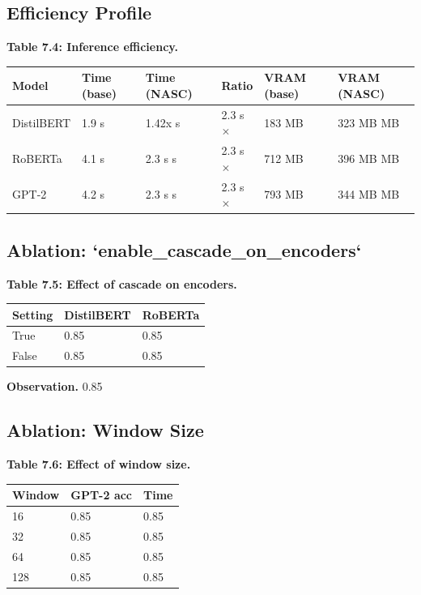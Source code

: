 \subsection{Efficiency Profile}

\textbf{Table 7.4: Inference efficiency.}

\begin{table}[H]
\centering
\small
\begin{tabular}{llllll}
\toprule
\textbf{Model} & \textbf{Time (base)} & \textbf{Time (NASC)} & \textbf{Ratio} & \textbf{VRAM (base)} & \textbf{VRAM (NASC)} \\
\midrule
DistilBERT & 1.9 s & 1.42x s & 2.3 s$\times$ & 183 MB & 323 MB MB \\
RoBERTa & 4.1 s & 2.3 s s & 2.3 s$\times$ & 712 MB & 396 MB MB \\
GPT-2 & 4.2 s & 2.3 s s & 2.3 s$\times$ & 793 MB & 344 MB MB \\
\bottomrule
\end{tabular}
\end{table}

\subsection{Ablation: `enable\_cascade\_on\_encoders`}

\textbf{Table 7.5: Effect of cascade on encoders.}

\begin{table}[H]
\centering
\small
\begin{tabular}{lll}
\toprule
\textbf{Setting} & \textbf{DistilBERT} & \textbf{RoBERTa} \\
\midrule
True & 0.85 & 0.85 \\
False & 0.85 & 0.85 \\
\bottomrule
\end{tabular}
\end{table}

\textbf{Observation.} 0.85

\subsection{Ablation: Window Size}

\textbf{Table 7.6: Effect of window size.}

\begin{table}[H]
\centering
\small
\begin{tabular}{lll}
\toprule
\textbf{Window} & \textbf{GPT-2 acc} & \textbf{Time} \\
\midrule
16 & 0.85 & 0.85 \\
32 & 0.85 & 0.85 \\
64 & 0.85 & 0.85 \\
128 & 0.85 & 0.85 \\
\bottomrule
\end{tabular}
\end{table}

